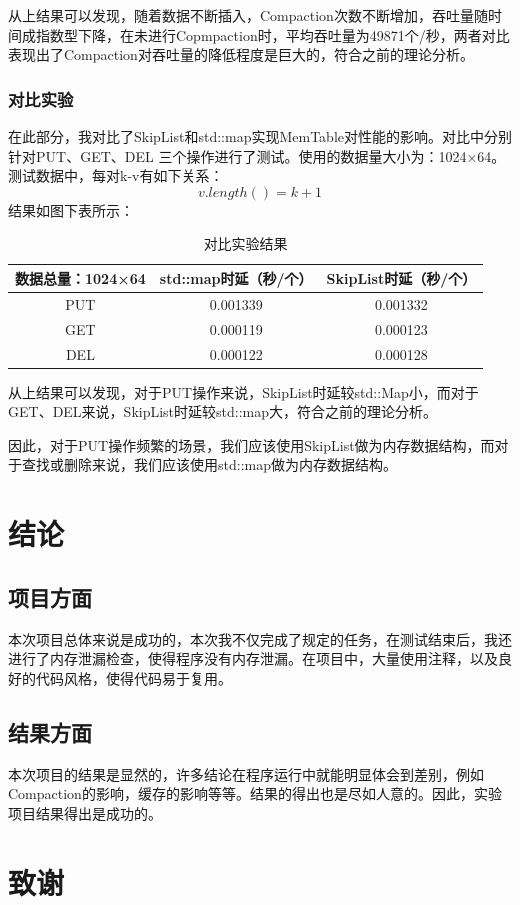 \documentclass[UTF8]{ctexart}
\begin{document}
从上结果可以发现，随着数据不断插入，Compaction次数不断增加，吞吐量随时间成指数型下降，在未进行Copmpaction时，平均吞吐量为49871个/秒，两者对比表现出了Compaction对吞吐量的降低程度是巨大的，符合之前的理论分析。
\subsubsection{对比实验}
在此部分，我对比了SkipList和std::map实现MemTable对性能的影响。对比中分别针对PUT、GET、DEL 三个操作进行了测试。使用的数据量大小为：1024×64。测试数据中，每对k-v有如下关系：
$$v.length()=k+1$$
结果如图下表所示：
\begin{table}[h]
    \centering
    \begin{tabular}{|c|c|c|}
        \hline
        数据总量：1024×64&	std::map时延（秒/个）&	SkipList时延（秒/个）\\
        \hline
        PUT&	0.001339&	0.001332\\
        \hline
        GET&	0.000119&	0.000123\\
        \hline
        DEL&	0.000122&	0.000128\\
        \hline
    \end{tabular}
    \caption{对比实验结果}
\end{table}

从上结果可以发现，对于PUT操作来说，SkipList时延较std::Map小，而对于GET、DEL来说，SkipList时延较std::map大，符合之前的理论分析。

因此，对于PUT操作频繁的场景，我们应该使用SkipList做为内存数据结构，而对于查找或删除来说，我们应该使用std::map做为内存数据结构。
\section{结论}
\subsection{项目方面}
本次项目总体来说是成功的，本次我不仅完成了规定的任务，在测试结束后，我还进行了内存泄漏检查，使得程序没有内存泄漏。在项目中，大量使用注释，以及良好的代码风格，使得代码易于复用。
\subsection{结果方面}
本次项目的结果是显然的，许多结论在程序运行中就能明显体会到差别，例如Compaction的影响，缓存的影响等等。结果的得出也是尽如人意的。因此，实验项目结果得出是成功的。
\section{致谢}
\end{document}
